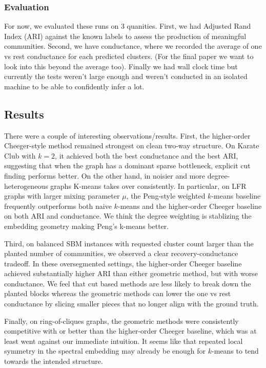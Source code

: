 \documentclass{article}
\theoremstyle{definition}
\theoremstyle{remark}
\begin{document}
\subsubsection{Evaluation}
For now, we evaluated these runs on 3 quanities. First, we had Adjusted Rand Index (ARI) against the known labels to assess the production of meaningful communities. Second, we have conductance, where we recorded the average of one vs rest conductance for each predicted clusters. (For the final paper we want to look into this beyond the average too). Finally we had wall clock time but currently the tests weren't large enough and weren't conducted in an isolated machine to be able to confidently infer a lot. 

\subsection{Results}
There were a couple of interesting observations/results.  First, the higher-order Cheeger-style method remained strongest on clean two-way structure. On Karate Club with $k=2$, it achieved both the best conductance and the best ARI, suggesting that when the graph has a dominant sparse bottleneck, explicit cut finding performs better. On the other hand, in noisier and more degree-heterogeneous graphs K-means takes over consistently. In particular, on LFR graphs with larger mixing parameter $\mu$, the Peng-style weighted $k$-means baseline frequently outperforms both naive $k$-means and the higher-order Cheeger baseline on both ARI and conductance. We think the degree weighting is stablizing the embedding geometry making Peng's k-means better.

Third, on balanced SBM instances with requested cluster count larger than the planted number of communities, we observed a clear recovery-conductance tradeoff. In these oversegmented settings, the higher-order Cheeger baseline achieved substantially higher ARI than either geometric method, but with worse conductance. We feel that cut based methods are less likely to break down the planted blocks whereas the geometric methods can lower the one vs rest conductance by slicing smaller pieces that no longer align with the ground truth. 

Finally, on ring-of-cliques graphs, the geometric methods were consistently competitive with or better than the higher-order Cheeger baseline, which was at least went against our immediate intuition. It seems like that repeated local symmetry in the spectral embedding may already be enough for $k$-means to tend towards the intended structure.
\end{document}
